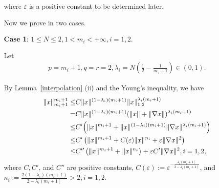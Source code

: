 \documentclass[onecolumn]{autart}
\newenvironment{proof of Prop.ODE}{{\it Proof of Proposition~\ref{Prop.ODE}:\enspace}}{\hfill $\blacksquare$\par}
\newenvironment{proof of PDE}{{\it Proof of Proposition \ref{Prop.8}:\enspace}}{\hfill $\blacksquare$\par}
\begin{document}
{\begin{proof of PDE}
	where $\varepsilon $ is a positive constant to be determined later.
	
	
	Now we prove in two cases.
	
	\textbf{Case 1}:  $1\leq N\leq 2, 1<m_{i}<+\infty, i=1, 2$.
	
	Let
	\begin{align*}
		p=m_{i}+1, q=r=2, {\lambda_{i}}=N\left(\frac{1}{2}-\frac{1}{m_{i}+1}\right)\in(0, 1).
	\end{align*}
	
	By Lemma~\ref{interpolation} (ii) and  the Young's inequality,  we have
	\begin{align}
		\|x\|^{m_{i}+1}_{{m_{i}+1}}\leq &  C\|x\|^{(1-{\lambda_{i}})(m_{i}+1)}\|x\|_{1, 2}^{{\lambda_{i}}(m_{i}+1)}\notag\\
		= & C\|x\|^{(1-{\lambda_{i}})(m_{i}+1)} {(\|  x\|+\| \nabla x\|)^{{\lambda_{i}}(m_{i}+1)}}\notag\\
		\leq &  C' {\left( \|x\|^{ m_{i}+1 }+ \|x\|^{(1-{\lambda_{i}})(m_{i}+1)}\| \nabla x\| ^{{\lambda_{i}}(m_{i}+1)}\right)}\notag\\
		\leq &  C'  \left(\|x\|^{ m_{i}+1 } + C(\varepsilon) \|x\|^{{n_i}}+{\varepsilon}\| \nabla x\|^{2} \right)\notag\\
		\leq &   C'' \left(\|x\|^{ m_{i}+1 } +\|x\|^{{n_i}}\right)+ \varepsilon C' \| \nabla x\|^{2}, i=1, 2,\label{15}
	\end{align}
	{where   $C,C'$, {and $C''$} are positive   constants, $C(\varepsilon):={\varepsilon^{-\frac{\lambda_i(m_i+1)}{2-\lambda_i(m_i+1)}}}$, and $n_i:=\frac{2(1-{\lambda_{i}})(m_{i}+1)}{2-{\lambda_{i}}(m_{i}+1)}>2, i=1,2$.}
	

\end{proof of PDE}}
\end{document}
